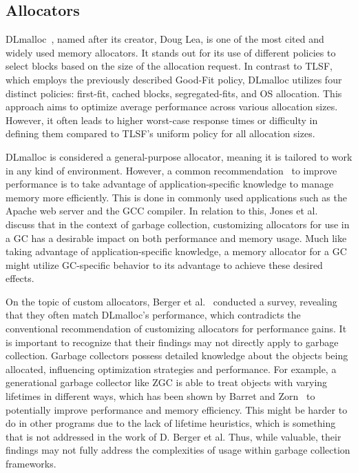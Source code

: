
\subsection{Allocators}

DLmalloc~\cite{dlmalloc}, named after its creator, Doug Lea, is one of the most cited and widely used memory allocators. It stands out for its use of different policies to select blocks based on the size of the allocation request. In contrast to TLSF, which employs the previously described Good-Fit policy, DLmalloc utilizes four distinct policies: first-fit, cached blocks, segregated-fits, and OS allocation. This approach aims to optimize average performance across various allocation sizes. However, it often leads to higher worst-case response times or difficulty in defining them compared to TLSF's uniform policy for all allocation sizes.

DLmalloc is considered a general-purpose allocator, meaning it is tailored to work in any kind of environment. However, a common recommendation~\cite{custom_rec_1, custom_rec_2} to improve performance is to take advantage of application-specific knowledge to manage memory more efficiently. This is done in commonly used applications such as the Apache web server and the GCC compiler. In relation to this, Jones et al.~\cite{gchandbook} discuss that in the context of garbage collection, customizing allocators for use in a GC has a desirable impact on both performance and memory usage. Much like taking advantage of application-specific knowledge, a memory allocator for a GC might utilize GC-specific behavior to its advantage to achieve these desired effects.

On the topic of custom allocators, Berger et al.~\cite{slow_custom_allocators} conducted a survey, revealing that they often match DLmalloc's performance, which contradicts the conventional recommendation of customizing allocators for performance gains. It is important to recognize that their findings may not directly apply to garbage collection. Garbage collectors possess detailed knowledge about the objects being allocated, influencing optimization strategies and performance. For example, a generational garbage collector like ZGC is able to treat objects with varying lifetimes in different ways, which has been shown by Barret and Zorn~\cite{lifetime_predictors_memalloc} to potentially improve performance and memory efficiency. This might be harder to do in other programs due to the lack of lifetime heuristics, which is something that is not addressed in the work of D. Berger et al. Thus, while valuable, their findings may not fully address the complexities of usage within garbage collection frameworks.

